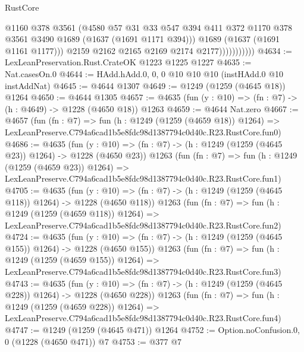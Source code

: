 \begin{lexlean}{RustCore}
\begin{coremodule}
                            @1160
                            @378
                            @3561
                            (@4580
                              @57
                              @31
                              @33
                              @547
                              @394
                              @411
                              @372
                              @1170
                              @378
                              @3561
                              @3490
                              @1689
                              (@1637 (@1691 @1171 @394)))
                            @1689
                            (@1637 (@1691 @1161 @1177)))
                          @2159
                          @2162
                          @2165
                          @2169
                          @2174
                          @2177)))))))))))
@4634 := LexLeanPreservation.Rust.CrateOK @1223 @1225 @1227
@4635 := Nat.casesOn.{0}
@4644 := HAdd.hAdd.{0, 0, 0} @10 @10 @10 (instHAdd.{0} @10 instAddNat)
@4645 := @4644 @1307
@4649 := @1249 (@1259 (@4645 @18)) @1264
@4650 := @4644 @1305
@4657 := @4635 (fun (y : @10) => (fn : @7) -> (h : @4649) -> @1228 (@4650 @18)) @1263
@4659 := @4644 Nat.zero
@4667 := @4657
    (fun (fn : @7) =>
    fun (h : @1249 (@1259 (@4659 @18)) @1264) =>
    LexLeanPreserve.C794a6cad1b5e8fdc98d1387794c0d40c.R23.RustCore.fun0)
@4686 := @4635
    (fun (y : @10) => (fn : @7) -> (h : @1249 (@1259 (@4645 @23)) @1264) -> @1228 (@4650 @23))
    @1263
    (fun (fn : @7) =>
    fun (h : @1249 (@1259 (@4659 @23)) @1264) =>
    LexLeanPreserve.C794a6cad1b5e8fdc98d1387794c0d40c.R23.RustCore.fun1)
@4705 := @4635
    (fun (y : @10) => (fn : @7) -> (h : @1249 (@1259 (@4645 @118)) @1264) -> @1228 (@4650 @118))
    @1263
    (fun (fn : @7) =>
    fun (h : @1249 (@1259 (@4659 @118)) @1264) =>
    LexLeanPreserve.C794a6cad1b5e8fdc98d1387794c0d40c.R23.RustCore.fun2)
@4724 := @4635
    (fun (y : @10) => (fn : @7) -> (h : @1249 (@1259 (@4645 @155)) @1264) -> @1228 (@4650 @155))
    @1263
    (fun (fn : @7) =>
    fun (h : @1249 (@1259 (@4659 @155)) @1264) =>
    LexLeanPreserve.C794a6cad1b5e8fdc98d1387794c0d40c.R23.RustCore.fun3)
@4743 := @4635
    (fun (y : @10) => (fn : @7) -> (h : @1249 (@1259 (@4645 @228)) @1264) -> @1228 (@4650 @228))
    @1263
    (fun (fn : @7) =>
    fun (h : @1249 (@1259 (@4659 @228)) @1264) =>
    LexLeanPreserve.C794a6cad1b5e8fdc98d1387794c0d40c.R23.RustCore.fun4)
@4747 := @1249 (@1259 (@4645 @471)) @1264
@4752 := Option.noConfusion.{0, 0} (@1228 (@4650 @471)) @7
@4753 := @377 @7

\end{coremodule}
\end{lexlean}
